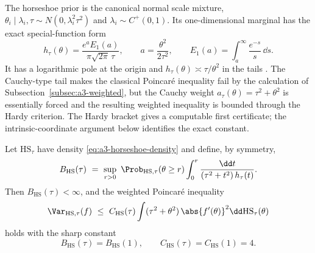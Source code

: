 \documentclass[../../main.tex]{subfiles}
\begin{document}
The horseshoe prior \cite{CarvalhoPolsonScott2010,CarvalhoPolsonScott2009} is the canonical
normal scale mixture, $\theta_i\mid\lambda_i,\tau\sim N(0,\lambda_i^2\tau^2)$ and
$\lambda_i\sim C^+(0,1)$. Its one-dimensional marginal has the exact special-function form
\begin{equation}\label{eq:a3-horseshoe-density}
  h_\tau(\theta)
  =\frac{e^aE_1(a)}{\pi\sqrt{2\pi}\,\tau},
  \qquad a=\frac{\theta^2}{2\tau^2},
  \qquad E_1(a)=\int_a^\infty\frac{e^{-s}}s\,\dd s .
\end{equation}
It has a logarithmic pole at the origin and $h_\tau(\theta)\asymp\tau/\theta^2$ in the tails
\cite{CarvalhoPolsonScott2010,Castillo2017HorseshoeDiscussion}. The Cauchy-type tail makes the
classical Poincar\'e inequality fail by the calculation of Subsection~\ref{subsec:a3-weighted}, but
the Cauchy weight $a_\tau(\theta)=\tau^2+\theta^2$ is essentially forced and the resulting weighted
inequality is bounded through the Hardy criterion.  The Hardy bracket gives a computable first
certificate; the intrinsic-coordinate argument below identifies the exact constant.

\begin{proposition}
\label{prop:a3-horseshoe}
Let $\mathrm{HS}_\tau$ have density \eqref{eq:a3-horseshoe-density} and define, by symmetry,
\[
  B_{\mathrm{HS}}(\tau)\ =\ \sup_{r>0}\ \Prob_{\mathrm{HS},\tau}(\theta\ge r)
  \int_0^r\frac{\dd t}{(\tau^2+t^2)\,h_\tau(t)} .
\]
Then $B_{\mathrm{HS}}(\tau)<\infty$, and the weighted Poincar\'e inequality
\[
  \Var_{\mathrm{HS},\tau}(f)\ \le\ C_{\mathrm{HS}}(\tau)\int(\tau^2+\theta^2)\,\abs{f'(\theta)}^2\dd\mathrm{HS}_\tau(\theta)
\]
holds with the sharp constant
\[
  B_{\mathrm{HS}}(\tau)=B_{\mathrm{HS}}(1),\qquad
  C_{\mathrm{HS}}(\tau)=C_{\mathrm{HS}}(1)=4.
\]
\end{proposition}
\end{document}
